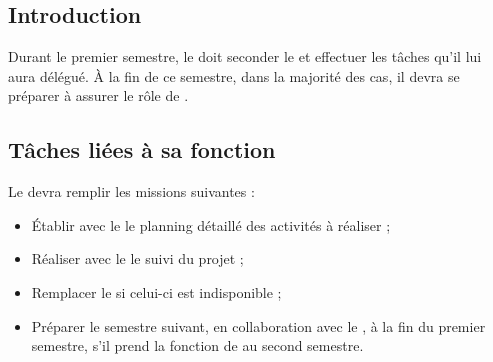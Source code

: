 
\subsection*{Introduction}


Durant le premier semestre, le \CPA{} doit seconder le \CP{} et effectuer les tâches qu’il lui aura délégué. À la fin de ce semestre, dans la majorité des cas, il devra se préparer à assurer le rôle de \CP.


\subsection*{Tâches liées à sa fonction}

Le \CPA{} devra remplir les missions suivantes :
\begin{itemize}
	\item Établir avec le \CP{} le planning détaillé des activités à réaliser ;
	\item Réaliser avec le \CP{} le suivi du projet ;
	\item Remplacer le \CP{} si celui-ci est indisponible ;

	\item Préparer le semestre suivant, en collaboration avec le \CP{}, à la fin du premier semestre, s’il prend la fonction de \CP{} au second semestre.

\end{itemize}
